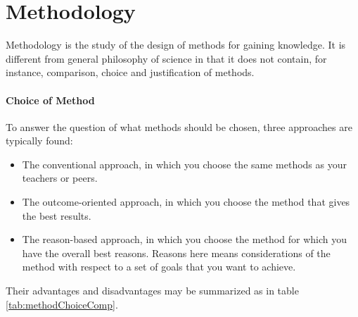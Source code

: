 \section{Methodology}

Methodology is the study of the design of methods for gaining knowledge. It is different from general philosophy of science in that it does not contain, for instance, comparison, choice and justification of methods.

\paragraph{Choice of Method}
To answer the question of what methods should be chosen, three approaches are typically found:
\begin{itemize}
	\item The conventional approach, in which you choose the same methods as your teachers or peers.
	\item The outcome-oriented approach, in which you choose the method that gives the best results.
	\item The reason-based approach, in which you choose the method for which you have the overall best reasons. Reasons here means considerations of the method with respect to a set of goals that you want to achieve.
\end{itemize}

Their advantages and disadvantages may be summarized as in table \ref{tab:methodChoiceComp}.

